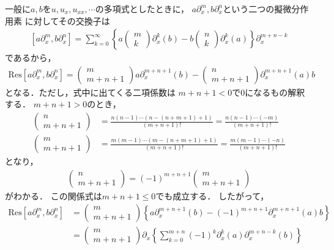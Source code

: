 \documentclass[dvipdfmx,12pt,a4paper,uplatex]{jsarticle}
\theoremstyle{plain}
\theoremstyle{definition}
\begin{document}
一般に$a,b$を$u,u_x,u_{xx},\cdots$の多項式としたときに，
$a\partial_x^m ,b\partial_x^n$という二つの擬微分作用素
に対してその交換子は
\begin{align}
\left[a\partial_x^m , b\partial_x^n \right] 
=
\sum_{k=0}^\infty 
\left\{
a
\begin{pmatrix} m \\ k \end{pmatrix}
\partial_x^k(b) 
-
b
\begin{pmatrix} n \\ k \end{pmatrix}
\partial_x^k(a) 
\right\}
\partial_x^{m+n-k}
\end{align}
であるから，
\begin{align}
\mathrm{Res}
\left[a\partial_x^m , b\partial_x^n \right] 
=
\begin{pmatrix} m \\ m+n+1 \end{pmatrix}
a\partial_x^{m+n+1}(b) 
-
\begin{pmatrix} n \\ m+n+1 \end{pmatrix}
\partial_x^{m+n+1}(a)b
\end{align}
となる．ただし，式中に出てくる二項係数は
$m+n+1<0$で$0$になるもの解釈する．
$m+n+1>0$のとき，
\begin{align}
\begin{pmatrix} n \\ m+n+1 \end{pmatrix}
&=
\frac{n(n-1)\cdots(n-(n+m+1)+1)}{(m+n+1)!}
=
\frac{n(n-1)\cdots(-m)}{(m+n+1)!} \nonumber \\
\begin{pmatrix} m \\ m+n+1 \end{pmatrix}
&=
\frac{m(m-1)\cdots(m-(n+m+1)+1)}{(m+n+1)!}
=
\frac{m(m-1)\cdots(-n)}{(m+n+1)!} 
\end{align}
となり，
\begin{align}
\begin{pmatrix} n \\ m+n+1 \end{pmatrix}
=
(-1)^{m+n+1}
\begin{pmatrix} m \\ m+n+1 \end{pmatrix}
\end{align}
がわかる．
この関係式は$m+n+1\le0$でも成立する．
したがって，
\begin{align}
\mathrm{Res}
\left[a\partial_x^m , b\partial_x^n \right] 
&=
\begin{pmatrix} m \\ m+n+1 \end{pmatrix}
\left\{
a\partial_x^{m+n+1}(b) 
-
(-1)^{m+n+1}
\partial_x^{m+n+1}(a)b
\right\} \nonumber\\
&=
\begin{pmatrix} m \\ m+n+1 \end{pmatrix}
\partial_x
\left\{
\sum_{k=0}^{m+n}(-1)^k \partial_x^{k}(a) \partial_x^{m+n-k}(b)
\right\}
\end{align}
\end{document}
